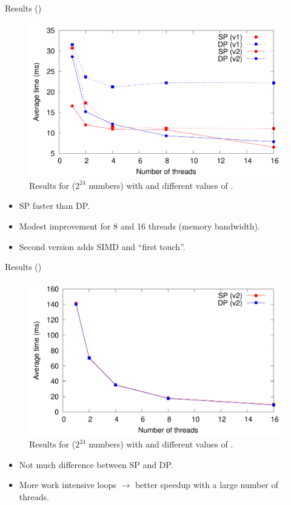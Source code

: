 \begin{frame}{Results ()}
\begin{figure}
	\centering
	\includegraphics[width=.75\textwidth]{im/result_OMP_saxpy}
	\caption{Results for  ($2^{24}$ numbers) with  and different values of .}
\end{figure}
\begin{itemize}
	\item SP faster than DP.
	\item Modest improvement for 8 and 16 threads (memory bandwidth).
	\item Second version adds SIMD and ``first touch''.
\end{itemize}
\end{frame}

\begin{frame}{Results ()}
	\begin{figure}
		\centering
		\includegraphics[width=.75\textwidth]{im/result_OMP_dot}
		\caption{Results for  ($2^{24}$ numbers) with  and different values of .}
	\end{figure}
\begin{itemize}
	\item Not much difference between SP and DP.
	\item More work intensive loops $\rightarrow$ better speedup with a large number of threads.
\end{itemize}
\end{frame}

